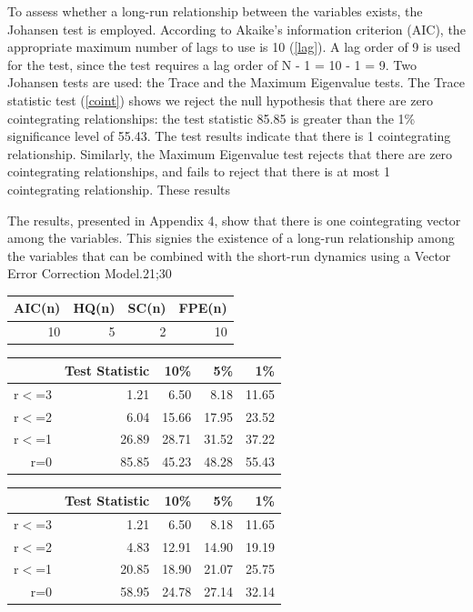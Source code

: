 \documentclass[11pt,preprint, authoryear]{elsarticle}
\let\origtable\table
\let\endorigtable\endtable
\renewenvironment{table}[1][2] {
    \expandafter\origtable\expandafter[H]
} {
    \endorigtable
}
\numberwithin{equation}{section}
\numberwithin{figure}{section}
\numberwithin{table}{section}
\begin{document}
To assess whether a long-run relationship between the variables exists,
the Johansen test is employed. According to Akaike's information
criterion (AIC), the appropriate maximum number of lags to use is 10
(\ref{lag}). A lag order of 9 is used for the test, since the test
requires a lag order of N - 1 = 10 - 1 = 9. Two Johansen tests are used:
the Trace and the Maximum Eigenvalue tests. The Trace statistic test
(\ref{coint}) shows we reject the null hypothesis that there are zero
cointegrating relationships: the test statistic 85.85 is greater than
the 1\% significance level of 55.43. The test results indicate that
there is 1 cointegrating relationship. Similarly, the Maximum Eigenvalue
test rejects that there are zero cointegrating relationships, and fails
to reject that there is at most 1 cointegrating relationship. These
results

The results, presented in Appendix 4, show that there is one
cointegrating vector among the variables. This signies the existence of
a long-run relationship among the variables that can be combined with
the short-run dynamics using a Vector Error Correction Model.21;30

\begin{table}[H]
\centering
\begin{tabular}{rrrr}
  \hline
AIC(n) & HQ(n) & SC(n) & FPE(n) \\ 
  \hline
 10 &   5 &   2 &  10 \\ 
   \hline
\end{tabular}
\caption{Optimal Lag Selection \label{lag}} 
\end{table}

\begin{table}[H]
\centering
\begin{tabular}{rrrrr}
  \hline
 & Test Statistic & 10\% & 5\% & 1\% \\ 
  \hline
r$<$=3 & 1.21 & 6.50 & 8.18 & 11.65 \\ 
  r$<$=2 & 6.04 & 15.66 & 17.95 & 23.52 \\ 
  r$<$=1 & 26.89 & 28.71 & 31.52 & 37.22 \\ 
  r=0 & 85.85 & 45.23 & 48.28 & 55.43 \\ 
   \hline
\end{tabular}
\caption{Johansen Trace Test for Cointegration Results\label{coint}} 
\end{table}
\begin{table}[H]
\centering
\begin{tabular}{rrrrr}
  \hline
 & Test Statistic & 10\% & 5\% & 1\% \\ 
  \hline
r$<$=3 & 1.21 & 6.50 & 8.18 & 11.65 \\ 
  r$<$=2 & 4.83 & 12.91 & 14.90 & 19.19 \\ 
  r$<$=1 & 20.85 & 18.90 & 21.07 & 25.75 \\ 
  r=0 & 58.95 & 24.78 & 27.14 & 32.14 \\ 
   \hline
\end{tabular}
\caption{Johansen Eigenvalue Test for Cointegration Results\label{eigen}} 
\end{table}
\end{document}
